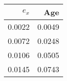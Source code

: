 \begin{tabular}{rr}
  \hline
$e_x$ & Age \\ 
  \hline
0.0022 & 0.0049 \\ 
  0.0072 & 0.0248 \\ 
  0.0106 & 0.0505 \\ 
  0.0145 & 0.0743 \\ 
   \hline
\end{tabular}
